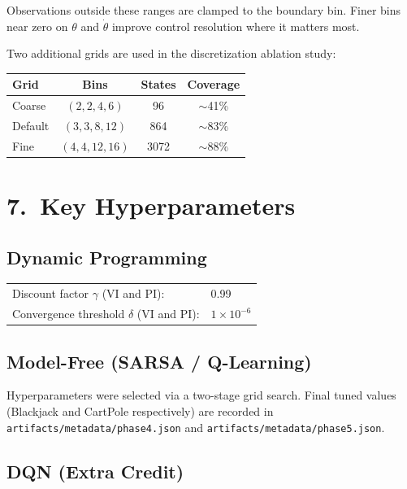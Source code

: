 \documentclass[letterpaper, 11pt]{article}
\begin{document}
Observations outside these ranges are clamped to the boundary bin.
Finer bins near zero on $\theta$ and $\dot{\theta}$ improve control resolution
where it matters most.

\medskip
Two additional grids are used in the discretization ablation study:

\begin{center}
\begin{tabular}{lccc}
\toprule
\textbf{Grid} & \textbf{Bins} & \textbf{States} & \textbf{Coverage} \\
\midrule
Coarse  & $(2, 2, 4, 6)$   & 96  & $\sim$41\% \\
Default & $(3, 3, 8, 12)$  & 864 & $\sim$83\% \\
Fine    & $(4, 4, 12, 16)$ & 3072 & $\sim$88\% \\
\bottomrule
\end{tabular}
\end{center}

\section*{7.\ Key Hyperparameters}

\subsection*{Dynamic Programming}

\begin{tabular}{ll}
Discount factor $\gamma$ (VI and PI): & 0.99 \\
Convergence threshold $\delta$ (VI and PI): & $1 \times 10^{-6}$ \\
\end{tabular}

\subsection*{Model-Free (SARSA / Q-Learning)}

Hyperparameters were selected via a two-stage grid search.
Final tuned values (Blackjack and CartPole respectively) are recorded in
\texttt{artifacts/metadata/phase4.json} and \texttt{artifacts/metadata/phase5.json}.

\subsection*{DQN (Extra Credit)}
\end{document}
